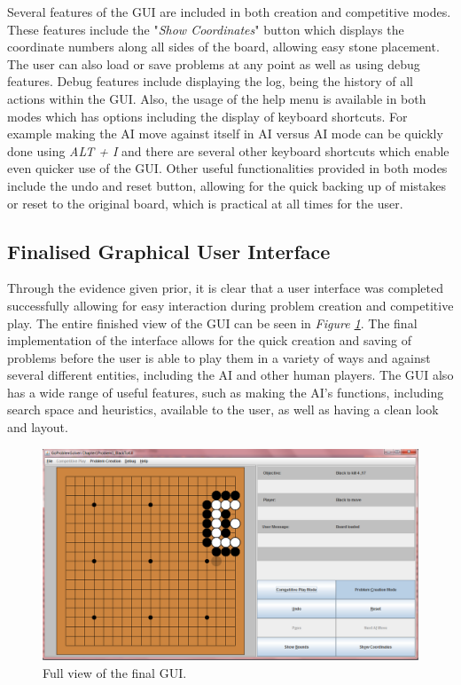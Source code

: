 \documentclass{l3proj}
\begin{document}
Several features of the GUI are included in both creation and competitive modes. These features include the "\textit{Show Coordinates}" button which displays the coordinate numbers along all sides of the board, allowing easy stone placement. The user can also load or save problems at any point as well as using debug features. Debug features include displaying the log, being the history of all actions within the GUI. Also, the usage of the help menu is available in both modes which has options including the display of keyboard shortcuts. For example making the AI move against itself in AI versus AI mode can be quickly done using \textit{ALT + I} and there are several other keyboard shortcuts which enable even quicker use of the GUI. Other useful functionalities provided in both modes include the undo and reset button, allowing for the quick backing up of mistakes or reset to the original board, which is practical at all times for the user.

\subsection{Finalised Graphical User Interface}

Through the evidence given prior, it is clear that a user interface was completed successfully allowing for easy interaction during problem creation and competitive play. The entire finished view of the GUI can be seen in \textit{Figure \ref{FinalGUI}}. The final implementation of the interface allows for the quick creation and saving of problems before the user is able to play them in a variety of ways and against several different entities, including the AI and other human players. The GUI also has a wide range of useful features, such as making the AI's functions, including search space and heuristics, available to the user, as well as having a clean look and layout.

\begin{figure}[H]
\centering
\includegraphics[scale=0.5]{Images/GUI-13-FullView.png}
\caption{Full view of the final GUI.}
\label{FinalGUI}
\end{figure}
\end{document}
